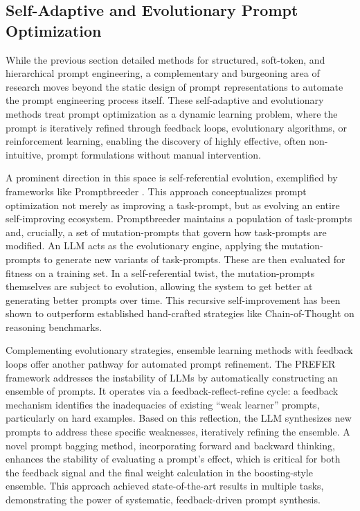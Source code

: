 \documentclass[11pt]{article}
\begin{document}
\subsection{Self-Adaptive and Evolutionary Prompt Optimization}

While the previous section detailed methods for structured, soft-token, and hierarchical prompt engineering, a complementary and burgeoning area of research moves beyond the static design of prompt representations to automate the prompt engineering process itself. These self-adaptive and evolutionary methods treat prompt optimization as a dynamic learning problem, where the prompt is iteratively refined through feedback loops, evolutionary algorithms, or reinforcement learning, enabling the discovery of highly effective, often non-intuitive, prompt formulations without manual intervention.

A prominent direction in this space is self-referential evolution, exemplified by frameworks like Promptbreeder \cite{ref169}. This approach conceptualizes prompt optimization not merely as improving a task-prompt, but as evolving an entire self-improving ecosystem. Promptbreeder maintains a population of task-prompts and, crucially, a set of mutation-prompts that govern how task-prompts are modified. An LLM acts as the evolutionary engine, applying the mutation-prompts to generate new variants of task-prompts. These are then evaluated for fitness on a training set. In a self-referential twist, the mutation-prompts themselves are subject to evolution, allowing the system to get better at generating better prompts over time. This recursive self-improvement has been shown to outperform established hand-crafted strategies like Chain-of-Thought on reasoning benchmarks.

Complementing evolutionary strategies, ensemble learning methods with feedback loops offer another pathway for automated prompt refinement. The PREFER framework \cite{ref170} addresses the instability of LLMs by automatically constructing an ensemble of prompts. It operates via a feedback-reflect-refine cycle: a feedback mechanism identifies the inadequacies of existing ``weak learner'' prompts, particularly on hard examples. Based on this reflection, the LLM synthesizes new prompts to address these specific weaknesses, iteratively refining the ensemble. A novel prompt bagging method, incorporating forward and backward thinking, enhances the stability of evaluating a prompt's effect, which is critical for both the feedback signal and the final weight calculation in the boosting-style ensemble. This approach achieved state-of-the-art results in multiple tasks, demonstrating the power of systematic, feedback-driven prompt synthesis.
\end{document}
